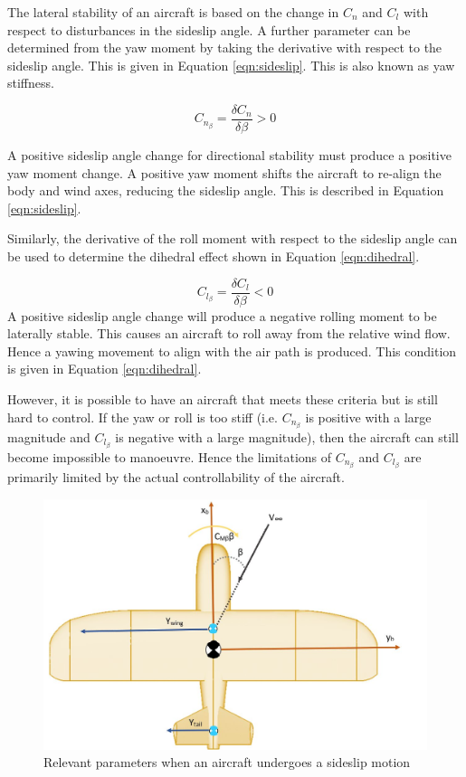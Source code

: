 The lateral stability of an aircraft is based on the change in $C_n$ and $C_l$ with respect to disturbances in the sideslip angle. A further parameter can be determined from the yaw moment by taking the derivative with respect to the sideslip angle. This is given in Equation \ref{eqn:sideslip}. This is also known as yaw stiffness.

\begin{equation}
    C_{n_\beta} = \frac{\delta C_n}{\delta \beta} > 0
    \label{eqn:sideslip}
\end{equation}


A positive sideslip angle change for directional stability must produce a positive yaw moment change. A positive yaw moment shifts the aircraft to re-align the body and wind axes, reducing the sideslip angle. This is described in Equation \ref{eqn:sideslip}. 

Similarly, the derivative of the roll moment with respect to the sideslip angle can be used to determine the dihedral effect shown in Equation \ref{eqn:dihedral}.

\begin{equation}
    C_{l_\beta} = \frac{\delta C_l}{\delta \beta} < 0
    \label{eqn:dihedral}
\end{equation}
A positive sideslip angle change will produce a negative rolling moment to be laterally stable. This causes an aircraft to roll away from the relative wind flow. Hence a yawing movement to align with the air path is produced. This condition is given in Equation \ref{eqn:dihedral}. 

However, it is possible to have an aircraft that meets these criteria but is still hard to control. If the yaw or roll is too stiff (i.e. $C_{n_\beta}$ is positive with a large magnitude and $C_{l_\beta}$ is negative with a large magnitude), then the aircraft can still become impossible to manoeuvre. Hence the limitations of $C_{n_\beta}$ and $C_{l_\beta}$ are primarily limited by the actual controllability of the aircraft. 




\begin{figure}[H]
  \centering
   \includegraphics[width=0.8\linewidth]{03_LiteratureReview/Figs/sideslip.JPG}
  \caption{Relevant parameters when an aircraft undergoes a sideslip motion}
  \label{fig:sideslip}
\end{figure}



